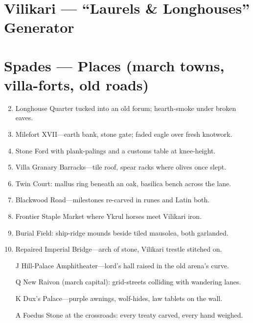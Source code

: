 \section{Vilikari --- ``Laurels \& Longhouses'' Generator}
\label{chap:vilikari}

\section*{Spades --- Places (march towns, villa-forts, old roads)}
\label{sec:vilikari-places}
\begin{enumerate}
\setcounter{enumi}{1}
\item Longhouse Quarter tucked into an old forum; hearth-smoke under broken eaves.
\item Milefort XVII---earth bank, stone gate; faded eagle over fresh knotwork.
\item Stone Ford with plank-palings and a customs table at knee-height.
\item Villa Granary Barracks---tile roof, spear racks where olives once slept.
\item Twin Court: mallus ring beneath an oak, basilica bench across the lane.
\item Blackwood Road---milestones re-carved in runes and Latin both.
\item Frontier Staple Market where Ykrul horses meet Vilikari iron.
\item Burial Field: ship-ridge mounds beside tiled mausolea, both garlanded.
\item Repaired Imperial Bridge---arch of stone, Vilikari trestle stitched on.
\item[J] Hill-Palace Amphitheater---lord's hall raised in the old arena's curve.
\item[Q] New Raivon (march capital): grid-streets colliding with wandering lanes.
\item[K] Dux's Palace---purple awnings, wolf-hides, law tablets on the wall.
\item[A] Foedus Stone at the crossroads: every treaty carved, every hand weighed.
\end{enumerate}

